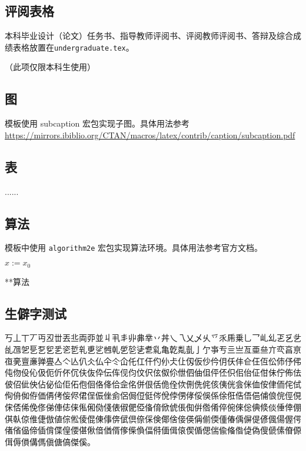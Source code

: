 \subsection{评阅表格}
本科毕业设计（论文）任务书、指导教师评阅书、评阅教师评阅书、答辩及综合成绩表格放置在\texttt{undergraduate.tex}。

（此项仅限本科生使用）

\subsection{图}
模板使用 \textsf{subcaption} 宏包实现子图。具体用法参考\url{https://mirrors.ibiblio.org/CTAN/macros/latex/contrib/caption/subcaption.pdf}

\subsection{表}
......

\subsection{算法}
模板中使用 \texttt{algorithm2e} 宏包实现算法环境。具体用法参考官方文档。

\begin{algorithm}
  \SetAlgoLined
  $x:=x_{0}$\;
  \caption{**算法}
  \label{algo:algorithm1}
\end{algorithm}

\nocite{*}

\subsection{生僻字测试}
丂丄丅丆丏丒丗丟丠両丣並丩丮丯丱丳丵丷丼乀乁乂乄乆乊乑乕乗乚乛乢乣乤乥乧乨乪乫乬乭乮乯乲乴乵乶乷乸乹乺乻乼乽乿亀亁亃亄亅亇亊亐亖亗亙亜亝亣亪亯亰亱亴亶亷亸亹亼亽亾仈仌仏仐仒仚仛仜仠仢仦仧仩仭仮仯仱仴仸仹仺仼仾伀伂伃伄伅伆伇伈伋伌伒伓伔伕伖伜伝伡伣伨伩伬伭伮伱伳伵伷伹伻伾伿佀佁佂佄佅佇佈佉佊佋佌佒佔佖佡佢佦佨佪佫佭佮佱佲併佷佸佹佺佽侀侁侂侅侇侊侌侎侐侒侓侕侘侙侚侜侞侟価侢侤侫侭侰侱侲侳侴侶侷侸侹侺侻侼侽侾俀俁係俆俇俈俉俋俌俍俒俓俔俕俖俙俛俢俤俥俧俫俬俰俲俴俵俶俷俹俻俼俽俿倀倁倂倃倄倅倇倈倊倎倐倓倕倖倗倛倝倞倠倢倣値倧倯倰倱倲倳倴倵倶倷倸倹倻倽倿偀偁偂偄偅偆偊偋偍偐偑偒偓偔偖偗偘偙偛偝偞偟偠偡偢偣偤偦偧偨偩偪偫偭偮偯偰偱偲偳偸偹偺偼偽傁傂傃傄傆傇傉傊傋傌傎傏傐傑傒。

